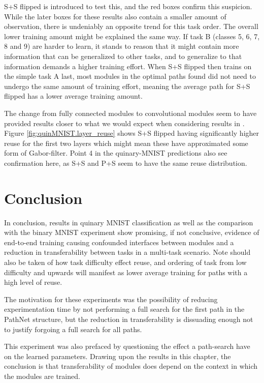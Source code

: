 S+S flipped is introduced to test this, and the red boxes confirm this suspicion. While the later boxes for these results also contain a smaller amount of observation, there is undeniably an opposite trend for this task order. The overall lower training amount might be explained the same way. If task B (classes 5, 6, 7, 8 and 9) are harder to learn, it stands to reason that it might contain more information that can be generalized to other tasks, and to generalize to that information demands a higher training effort. When S+S flipped then trains on the simple task A last, most modules in the optimal paths found did not need to undergo the same amount of training effort, meaning the average path for S+S flipped has a lower average training amount.

The change from fully connected modules to convolutional modules seem to have provided results closer to what we would expect when considering results in \cite{yosinski2014transferable}. Figure \ref{fig:quinMNIST.layer_reuse} shows S+S flipped having significantly higher reuse for the first two layers which might mean these have approximated some form of Gabor-filter. Point 4 in the quinary-MNIST predictions also see confirmation here, as S+S and P+S seem to have the same reuse distribution. 

\section{Conclusion}
In conclusion, results in quinary MNIST classification as well as the comparison with the binary MNIST experiment show promising, if not conclusive, evidence of end-to-end training causing confounded interfaces between modules and a reduction in transferability between tasks in a multi-task scenario. Note should also be taken of how task difficulty effect reuse, and ordering of task from low difficulty and upwards will manifest as lower average training for paths with a high level of reuse.

The motivation for these experiments was the possibility of reducing experimentation time by not performing a full search for the first path in the PathNet structure, but the reduction in transferability is dissuading enough not to justify forgoing a full search for all paths. 

This experiment was also prefaced by questioning the effect a path-search have on the learned parameters. Drawing upon the results in this chapter, the conclusion is that transferability of modules does depend on the context in which the modules are trained.